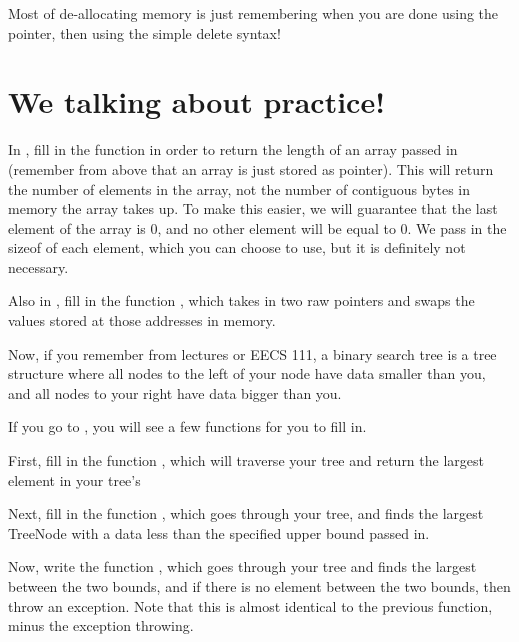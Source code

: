 \documentclass{tufte-handout}
\begin{document}

Most of de-allocating memory is just remembering when you are done using the pointer, then using the simple delete syntax!


\section{We talking about practice!}


In , fill in the function  in order to return the length of an array passed in (remember from above that an array is just stored as pointer).
This will return the number of elements in the array, not the number of contiguous bytes in memory the array takes up.
To make this easier, we will guarantee that the last element of the array is 0, and no other element will be equal to 0.
We pass in the sizeof of each element, which you can choose to use, but it is definitely not necessary.

Also in , fill in the function , which takes in two raw pointers and swaps the values stored at those addresses in memory.

Now, if you remember from lectures or EECS 111, a binary search tree is a tree structure where all nodes to the left of your node have data smaller than you, and all nodes to your right have data bigger than you.

If you go to , you will see a few functions for you to fill in.

First, fill in the function , which will traverse your tree and return the largest element in your tree's 

Next, fill in the function , which goes through your tree, and finds the largest TreeNode with a data less than the specified upper bound passed in.

Now, write the function , which goes through your tree and finds the largest  between the two bounds, and if there is no element between the two bounds, then throw an exception.
Note that this is almost identical to the previous function, minus the exception throwing.
\end{document}
